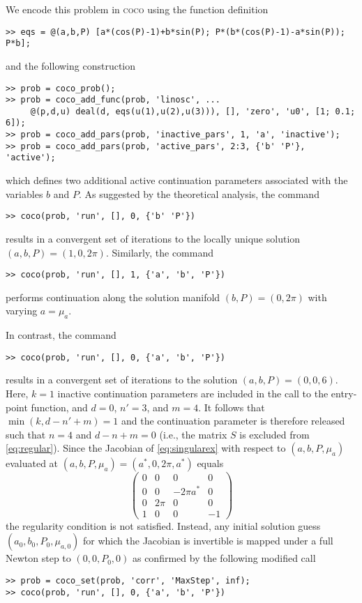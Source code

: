 We encode this problem in \textsc{coco} using the function definition
 \begin{lstlisting}[language=coco-highlight]
>> eqs = @(a,b,P) [a*(cos(P)-1)+b*sin(P); P*(b*(cos(P)-1)-a*sin(P)); P*b];
\end{lstlisting}
and the following construction
 \begin{lstlisting}[language=coco-highlight]
>> prob = coco_prob();
>> prob = coco_add_func(prob, 'linosc', ...
     @(p,d,u) deal(d, eqs(u(1),u(2),u(3))), [], 'zero', 'u0', [1; 0.1; 6]);
>> prob = coco_add_pars(prob, 'inactive_pars', 1, 'a', 'inactive');
>> prob = coco_add_pars(prob, 'active_pars', 2:3, {'b' 'P'}, 'active');
\end{lstlisting}
which defines two additional active continuation parameters associated with the variables $b$ and $P$. As suggested by the theoretical analysis, the command
 \begin{lstlisting}[language=coco-highlight]
>> coco(prob, 'run', [], 0, {'b' 'P'})
\end{lstlisting}
results in a convergent set of iterations to the locally unique solution $(a,b,P)=(1,0,2\pi)$. Similarly, the command
 \begin{lstlisting}[language=coco-highlight]
>> coco(prob, 'run', [], 1, {'a', 'b', 'P'})
\end{lstlisting}
performs continuation along the solution manifold $(b,P)=(0,2\pi)$ with varying $a=\mu_a$.

In contrast, the command
 \begin{lstlisting}[language=coco-highlight]
>> coco(prob, 'run', [], 0, {'a', 'b', 'P'})
\end{lstlisting}
results in a convergent set of iterations to the solution $(a,b,P)=(0,0,6)$. Here, $k=1$ inactive continuation parameters are included in the call to the  entry-point function, and $d=0$, $n'=3$, and $m=4$. It follows that $\min(k,d-n'+m)=1$ and the continuation parameter  is therefore released such that $n=4$ and $d-n+m=0$ (i.e., the matrix $S$ is excluded from \eqref{eq:regular}). Since the Jacobian of \eqref{eq:singularex} with respect to $(a,b,P,\mu_a)$ evaluated at $(a,b,P,\mu_a)=(a^*,0,2\pi,a^*)$ equals
\begin{equation}
\begin{pmatrix}
0 & 0 & 0 & 0\\0 & 0 & -2\pi a^* & 0\\0 & 2\pi & 0 & 0\\1 & 0 & 0 & -1
\end{pmatrix}
\end{equation}
the regularity condition is not satisfied. Instead, any initial solution guess $(a_0,b_0,P_0,\mu_{a,0})$ for which the Jacobian is invertible is mapped under a full Newton step to $(0,0,P_0,0)$ as confirmed by the following modified call
 \begin{lstlisting}[language=coco-highlight]
>> prob = coco_set(prob, 'corr', 'MaxStep', inf);
>> coco(prob, 'run', [], 0, {'a', 'b', 'P'})
\end{lstlisting}

